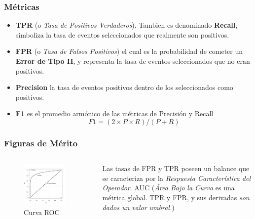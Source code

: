\documentclass[11pt]{beamer}
\begin{document}
\begin{frame} \frametitle{M\'etricas}
 \small
\begin{itemize}[<+->]
 \item \textbf{TPR} (o \textit{Tasa de Positivos Verdaderos}). Tambien es denominado \textbf{Recall}, simboliza la tasa de eventos seleccionados que realmente son positivos.
\item \textbf{FPR} (o \textit{Tasa de Falsos Positivos}) el cual es la probabilidad de cometer un \textbf{Error de Tipo II}, y representa la tasa de eventos seleccionados que no eran positivos.
\item \textbf{Precision} la tasa de eventos positivos dentro de los seleccionados como positivos.
\item \textbf{F1} es el promedio arm\'onico de las m\'etricas de Precisi\'on y Recall
$$F1 = (2 \times P \times R)/(P + R) $$
\end{itemize}
\end{frame}
\begin{frame} \frametitle{Figuras de M\'erito}
 \small
 \begin{columns}[T]
 \begin{column}{0.7\textwidth}
 \begin{figure}
 \centering
 \includegraphics[width=0.85\textwidth]{./images/imgs_seminario1/ROC.png}
 \caption{\scriptsize{Curva ROC}}
\end{figure}
\end{column}
\begin{column}{0.28\textwidth}
 Las tasas de FPR y TPR poseen un balance que se 
 caracteriza por la \textit{Respuesta Caracter\'{i}stica del Operador}.
% 
 AUC (\textit{\'Area Bajo la Curva} es una m\'etrica global.
%
 TPR y FPR, y sus derivadas \textit{son dados un valor umbral.})
 \end{column}
 \end{columns}
\end{frame}
\end{document}
